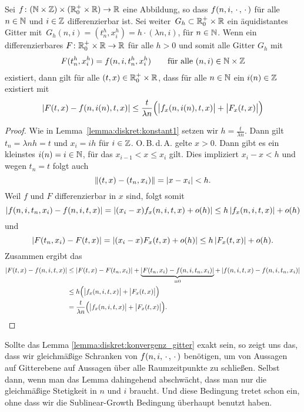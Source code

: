 \begin{lemma}\label{lemma:diskret:konvergenz_gitter}
Sei $f\colon (\mathbb N \times \mathbb Z) \times (\mathbb R^+_0 \times \mathbb R) \to \mathbb R$ eine Abbildung, so dass $f(n,i,\, \cdot \,,\, \cdot \,)$ für alle $n \in \mathbb N$ und $i \in \mathbb Z$ differenzierbar ist.
Sei weiter\, $G_h \subset \mathbb R^+_0 \times \mathbb R$ ein äquidistantes Gitter mit\, $G_h(n,i) = (t^h_n, x^h_i) = h \cdot (\lambda n, i)$, für $n \in \mathbb N$.
Wenn ein differenzierbares $F\colon \mathbb R^+_0 \times \mathbb R \to \mathbb R$ für alle $h > 0$ und somit alle Gitter $G_h$ mit
\begin{align}\label{eq:lemma:diag:voraussetzung}
F(t^h_n, x^h_i) = f(n, i, t^h_n, x^h_i) \qquad \text{für alle $(n,i) \in \mathbb N \times \mathbb Z$}
\end{align}
existiert, dann gilt für alle $(t, x) \in \mathbb R^+_0 \times \mathbb R$, dass für alle $n \in \mathbb N$ ein $i(n) \in \mathbb Z$ existiert mit
\begin{align}\label{eq:lemma:diag:aussage}
\left| F(t, x) - f(n, i(n), t, x) \right| \leq \frac {t}{\lambda n} \Bigl(\bigl\lvert f_x(n, i(n), t, x) \bigr\rvert + \bigl\lvert F_x(t, x) \bigr\rvert \Bigr)
\end{align}
\end{lemma}
\begin{proof}
Wie in Lemma~\ref{lemma:diskret:konstant1} setzen wir $h = \frac {t}{\lambda n}$.
Dann gilt $t_n = \lambda n h = t$ und $x_i = i h$ für $i \in \mathbb Z$.
O.\,B.\,d.\,A. gelte $x > 0$.
Dann gibt es ein kleinstes $i(n) = i \in \mathbb N$, für das $x_{i-1} < x \leq x_i$ gilt.
Dies impliziert $x_i - x < h$ und wegen $t_n = t$ folgt auch
\[ \left\lVert (t,x) - (t_n, x_i) \right\rVert = \left| x - x_i \right| < h. \]
Weil $f$ und $F$ differenzierbar in $x$ sind, folgt somit
\[ \left| f(n, i, t_n, x_i) - f(n, i, t, x) \right| = \left| (x_i - x) f_x(n, i, t, x) + o(h) \right| \leq h \left| f_x(n, i, t, x) \right| + o(h) \]
und
\[ \left| F(t_n, x_i) - F(t, x) \right| = \left| (x_i - x) F_x(t, x) + o(h) \right| \leq h \left| F_x(t, x) \right| + o(h). \]
Zusammen ergibt das
{\small
\begin{align*}
\left| F(t,x) - f(n, i, t, x) \right| &\leq \left| F(t, x) - F(t_n, x_i) \right| + \underbrace{\left| F(t_n, x_i) - f(n, i, t_n, x_i) \right|}_{= 0} + \left| f(n,i, t, x) - f(n, i, t_n, x_i) \right|\\
&\leq h \Bigl(\bigl\lvert f_x(n, i, t, x) \bigr\rvert + \bigl\lvert F_x(t, x) \bigr\rvert \Bigr)\\
&= \frac {t}{\lambda n} \Bigl(\bigl\lvert f_x(n, i, t, x) \bigr\rvert + \bigl\lvert F_x(t, x) \bigr\rvert \Bigr). \qedhere
\end{align*}
}
\end{proof}
Sollte das Lemma \ref{lemma:diskret:konvergenz_gitter} exakt sein, so zeigt uns das, dass wir gleichmäßige Schranken von $f(n, i, \, \cdot \,, \, \cdot \,)$ benötigen, um von Aussagen auf Gitterebene auf Aussagen über alle Raumzeitpunkte zu schließen.
Selbst dann, wenn man das Lemma dahingehend abschwächt, dass man nur die gleichmäßige Stetigkeit in $n$ und $i$ braucht.
Und diese Bedingung tretet schon ein, ohne dass wir die Sublinear-Growth Bedingung überhaupt benutzt haben.


